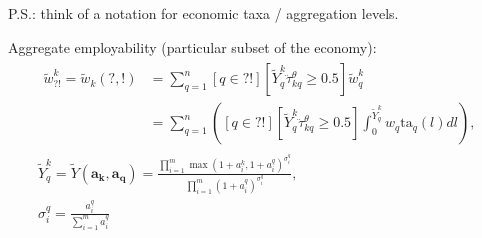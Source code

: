 \documentclass[hidelinks, nonatbib]{elsarticle}
\begin{document}
P.S.: think of a notation for economic taxa / aggregation levels.

Aggregate employability (particular subset of the economy):
\begin{gather}
    \begin{align}
        \tilde{w}_{?!}^{k} =
        \tilde{w}_{k}(?, !)
        &=
        \sum_{q=1}^{n}{
            [q \in ?!]
            [
                \tilde{Y}_{q}^{k}
                \ddot{\tau}_{kq}^{\theta}
                \geq 0.5
            ]
            \tilde{w}_{q}^{k}
        }
        \\
        &=
        \sum_{q=1}^{n}{
            \left(
                [q \in ?!]
                [
                \tilde{Y}_{q}^{k}
                \ddot{\tau}_{kq}^{\theta}
                \geq 0.5
                ]
                \int_{0}^{\tilde{Y}_{q}^{k}}{
                    w_q
                    \text{ta}_q(l)
                    dl
                }
            \right)
        }
        ,
    \end{align}
    \\
    \tilde{Y}_{q}^{k} = 
    \tilde{Y}(
        \boldsymbol{a_k},
        \boldsymbol{a_q}
        ) =
        \frac{
            \prod_{i=1}^{m}{
                {
                    \max(
                        1 + a_{i}^{k},
                        1 + a_{i}^{q}
                    )
                } ^ {
                    \sigma_{i}^{q}
                }
            }
        }{
            \prod_{i=1}^{m}{
                {
                    (
                        1 + a_{i}^{q}
                    )
                } ^ {
                    \sigma_{i}^{q}
                }
            }
        }
        ,\\
        \sigma_{i}^{q} = 
        \frac{
            a_{i}^{q}
        }{
            \sum_{i=1}^{m}{
                a_{i}^{q}
            }
        }
\end{gather}
\end{document}
